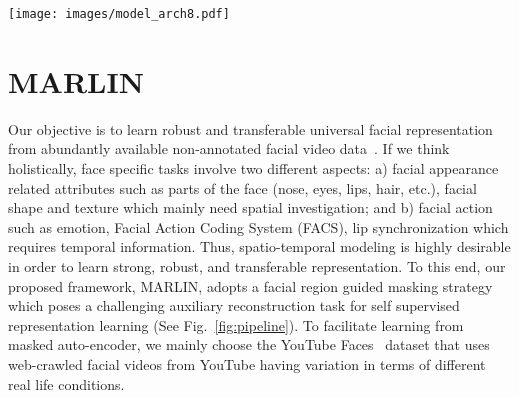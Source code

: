 \documentclass[10pt,twocolumn,letterpaper]{article}
\begin{document}
\begin{figure*}
    \centering
    \texttt{[image: images/model\_arch8.pdf]}
    \caption{\textbf{Architectural overview of MARLIN (Best viewed in color).} MARLIN mainly consists of (a) Representation Learning Module, (b) Facial Region guided Tube Masking, and (c) Downstream Adaptation. (a) \textit{Representation Learning Module:} MARLIN learns the facial representation from the unlabeled, web crawled video data in a self-supervised fashion (highlighted in \textcolor{Cerulean}{Blue}). (b) \textit{Facial Region guided Tube Masking:} With the aid of facial region guided tube masking (highlighted in \textcolor{Apricot}{Yellow}), MARLIN gets joint spatio-temporal attention which in turn facilitates downstream performance. The Face guided tube masking strategy injects domain knowledge into the pipeline. (c) \textit{Downstream Adaptation:} For facial task specific downstream adaptation, MARLIN utilizes Linear Probing (LP) and Fine-Tuning (FT) to show the robustness, generalizability, and transferability of the learned feature (highlighted in \textcolor{OliveGreen}{Green}).}
    \label{fig:pipeline}
    \vspace{-3mm}
\end{figure*}


\section{MARLIN}\label{sec:marlin}
Our objective is to learn robust and transferable universal facial representation from abundantly available non-annotated facial video data~\cite{wolfFace2011}. 
If we think holistically, face specific tasks involve two different aspects: a) facial appearance related attributes such as parts of the face (nose, eyes, lips, hair, etc.), facial shape and texture which mainly need spatial investigation; and b) facial action such as emotion, Facial Action Coding System (FACS), lip synchronization which requires temporal information. Thus, spatio-temporal modeling is highly desirable in order to learn strong, robust, and transferable representation. To this end, our proposed framework, MARLIN, adopts a facial region guided masking strategy which poses a challenging auxiliary reconstruction task for self supervised representation learning (See Fig.~\ref{fig:pipeline}). 
To facilitate learning from masked auto-encoder, we mainly choose the YouTube Faces~\cite{wolfFace2011} dataset that uses web-crawled facial videos from YouTube having variation in terms of different real life conditions. 
\end{document}
